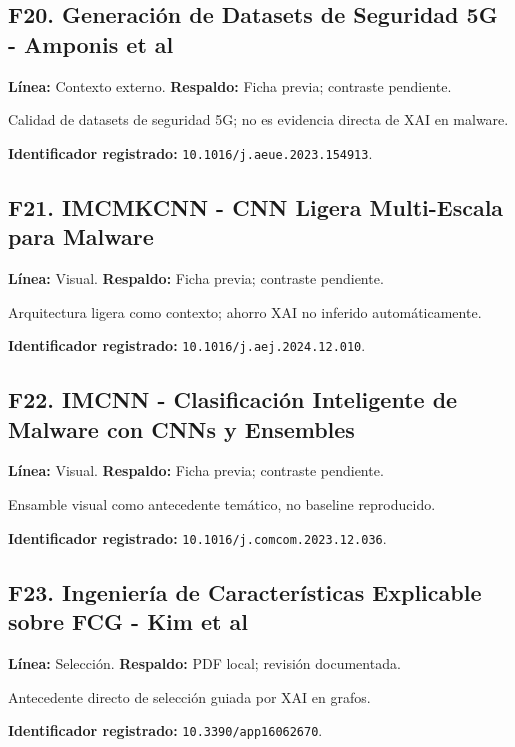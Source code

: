 \begin{samepage}
\subsection*{F20. Generación de Datasets de Seguridad 5G - Amponis et al}
\noindent\textbf{Línea:} Contexto externo. \textbf{Respaldo:} Ficha previa; contraste pendiente. 

Calidad de datasets de seguridad 5G; no es evidencia directa de XAI en malware.

\noindent\textbf{Identificador registrado:} \nolinkurl{10.1016/j.aeue.2023.154913}.

\end{samepage}
\begin{samepage}
\subsection*{F21. IMCMKCNN - CNN Ligera Multi-Escala para Malware}
\noindent\textbf{Línea:} Visual. \textbf{Respaldo:} Ficha previa; contraste pendiente. 

Arquitectura ligera como contexto; ahorro XAI no inferido automáticamente.

\noindent\textbf{Identificador registrado:} \nolinkurl{10.1016/j.aej.2024.12.010}.

\end{samepage}
\begin{samepage}
\subsection*{F22. IMCNN - Clasificación Inteligente de Malware con CNNs y Ensembles}
\noindent\textbf{Línea:} Visual. \textbf{Respaldo:} Ficha previa; contraste pendiente. 

Ensamble visual como antecedente temático, no baseline reproducido.

\noindent\textbf{Identificador registrado:} \nolinkurl{10.1016/j.comcom.2023.12.036}.

\end{samepage}
\begin{samepage}
\subsection*{F23. Ingeniería de Características Explicable sobre FCG - Kim et al}
\noindent\textbf{Línea:} Selección. \textbf{Respaldo:} PDF local; revisión documentada. \parencite{Kim2026FCG}

Antecedente directo de selección guiada por XAI en grafos.

\noindent\textbf{Identificador registrado:} \nolinkurl{10.3390/app16062670}.

\end{samepage}
